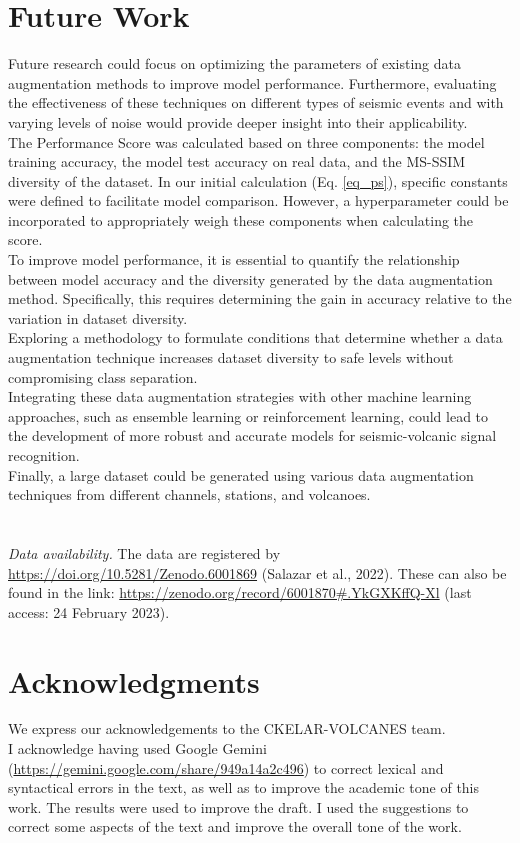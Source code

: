 \documentclass[lettersize,journal]{IEEEtran}
\begin{document}
\section{Future Work}\label{future_work}
\noindent Future research could focus on optimizing the parameters of existing data augmentation methods to improve model performance. Furthermore, evaluating the effectiveness of these techniques on different types of seismic events and with varying levels of noise would provide deeper insight into their applicability. \\
The Performance Score was calculated based on three components: the model training accuracy, the model test accuracy on real data, and the MS-SSIM diversity of the dataset. In our initial calculation (Eq. \ref{eq_ps}), specific constants were defined to facilitate model comparison. However, a hyperparameter could be incorporated to appropriately weigh these components when calculating the score.\\
To improve model performance, it is essential to quantify the relationship between model accuracy and the diversity generated by the data augmentation method. Specifically, this requires determining the gain in accuracy relative to the variation in dataset diversity.\\
Exploring a methodology to formulate conditions that determine whether a data augmentation technique increases dataset diversity to safe levels without compromising class separation.\\
Integrating these data augmentation strategies with other machine learning approaches, such as ensemble learning or reinforcement learning, could lead to the development of more robust and accurate models for seismic-volcanic signal recognition.\\ 
Finally, a large dataset could be generated using various data augmentation techniques from different channels, stations, and volcanoes.
\\
\\
\\
\textit{Data availability.} The data are registered by \href{https://doi.org/10.5281/Zenodo.6001869}{https://doi.org/10.5281/Zenodo.6001869} (Salazar et al., 2022). These can also be found in the link: \href{https://zenodo.org/record/6001870#.YkGXKffQ-Xl}{https://zenodo.org/record/6001870\#.YkGXKffQ-Xl} (last access: 24 February 2023).
\\
\section*{Acknowledgments}
\noindent We express our acknowledgements to the CKELAR-VOLCANES team.\\
I acknowledge having used Google Gemini (\href{https://gemini.google.com/share/949a14a2c496}{https://gemini.google.com/share/949a14a2c496}) to correct lexical and syntactical errors in the text, as well as to improve the academic tone of this work. The results were used to improve the draft. I used the suggestions to correct some aspects of the text and improve the overall tone of the work.
\end{document}

